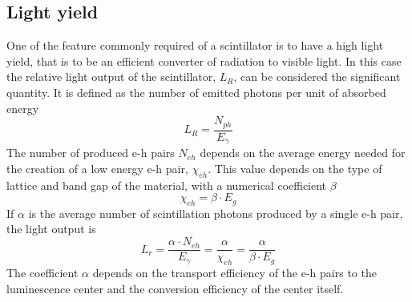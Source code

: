 \subsection{Light yield}
One of the feature commonly required of a scintillator is to have a high light yield, that is to be an efficient converter of radiation to visible light.
In this case the relative light output of the scintillator, $L_{R}$, can be considered the significant quantity. It is defined as the number of emitted photons per unit of absorbed energy \cite{Rodnyi1997}
\begin{equation}
L_{R} = \frac{N_{ph}}{E_{\gamma}}
\end{equation}
The number of produced e-h pairs $N_{eh}$ depends on the average energy needed for the creation of a low energy e-h pair, $\chi _{eh}$. This value depends on the type of lattice and band gap of the material, with a numerical coefficient $\beta$
\begin{equation}
\chi _{eh} = \beta \cdot  E_{g}
\end{equation}
If $\alpha$ is the average number of scintillation photons produced by a single e-h pair, the light output is
\begin{equation}
L_{r} = \frac{\alpha \cdot N_{eh}}{E_{\gamma}} = \frac{\alpha}{\chi _{eh}} = \frac{\alpha}{\beta \cdot E_{g}}
\end{equation}
The coefficient $\alpha$ depends on the transport efficiency of the e-h pairs to the luminescence center and the conversion efficiency of the center itself.

